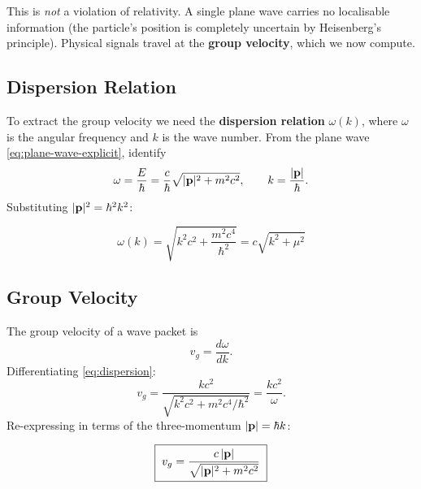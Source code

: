 \documentclass[12pt, a4paper]{article}
\theoremstyle{definition}
\begin{document}
This is \emph{not} a violation of relativity.  A single plane wave carries no
localisable information (the particle's position is completely uncertain by
Heisenberg's principle).  Physical signals travel at the \textbf{group
velocity}, which we now compute.

\subsection{Dispersion Relation}

To extract the group velocity we need the \textbf{dispersion relation}
$\omega(k)$, where $\omega$ is the angular frequency and $k$ is the wave
number.  From the plane wave \eqref{eq:plane-wave-explicit}, identify
\begin{equation}
    \omega = \frac{E}{\hbar}
    = \frac{c}{\hbar}\sqrt{|\vb{p}|^{2}+m^{2}c^{2}},
    \qquad
    k = \frac{|\vb{p}|}{\hbar}.
\end{equation}
Substituting $|\vb{p}|^{2} = \hbar^{2}k^{2}$:

\begin{result}
\begin{equation}\label{eq:dispersion}
    \boxed{\;
    \omega(k) = \sqrt{k^{2}c^{2} + \frac{m^{2}c^{4}}{\hbar^{2}}}
    = c\sqrt{k^{2} + \mu^{2}}
    \;}
\end{equation}
\end{result}

\subsection{Group Velocity}

The group velocity of a wave packet is
\begin{equation}\label{eq:vg-def}
    v_{g} = \frac{d\omega}{dk}.
\end{equation}
Differentiating \eqref{eq:dispersion}:
\begin{equation}\label{eq:vg-k}
    v_{g}
    = \frac{kc^{2}}{\sqrt{k^{2}c^{2} + m^{2}c^{4}/\hbar^{2}}}
    = \frac{kc^{2}}{\omega}.
\end{equation}
Re-expressing in terms of the three-momentum $|\vb{p}| = \hbar k$:

\begin{result}
\begin{equation}\label{eq:vg}
    \boxed{\;
    v_{g}
    = \frac{c\,|\vb{p}|}{\sqrt{|\vb{p}|^{2} + m^{2}c^{2}}}
    \;}
\end{equation}
\end{result}
\end{document}
